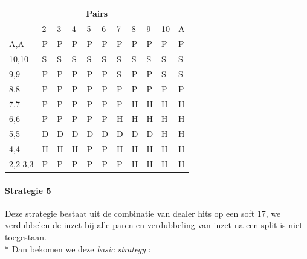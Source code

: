 \documentclass[conference]{IEEEtran}
\begin{document}
\begin{table}[ht]
\begin{tabular}{|l|l|l|l|l|l|l|l|l|l|l|}
\multicolumn{11}{|c|}{\textbf{Pairs}}                                 \\ \hline
                             & 2 & 3 & 4 & 5 & 6 & 7 & 8 & 9 & 10 & A \\ \hline
A,A                          & P & P & P & P & P & P & P & P & P & P  \\ \hline
10,10                        & S & S & S & S & S & S & S & S & S & S  \\ \hline
9,9                          & P & P & P & P & P & S & P & P & S & S  \\ \hline
8,8                          & P & P & P & P & P & P & P & P & P & P  \\ \hline
7,7                          & P & P & P & P & P & P & H & H & H & H  \\ \hline
6,6                          & P & P & P & P & P & H & H & H & H & H  \\ \hline
5,5                          & D & D & D & D & D & D & D & D & H & H  \\ \hline
4,4                          & H & H & H & P & P & H & H & H & H & H  \\ \hline
2,2-3,3                      & P & P & P & P & P & P & H & H & H & H  \\ \hline
\end{tabular}
\end{table}

\paragraph{Strategie 5}
Deze strategie bestaat uit de combinatie van dealer hits op een soft 17, we verdubbelen de inzet bij alle paren en verdubbeling van inzet na een split is niet toegestaan.\\*
Dan bekomen we deze \textit{basic strategy} :
\end{document}
